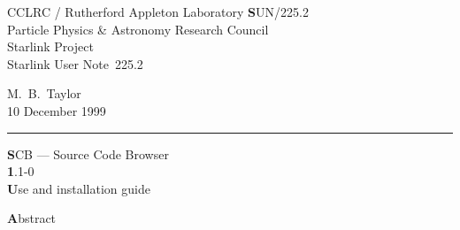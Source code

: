 \documentclass[twoside,11pt]{article}
\newcommand{\stardoccategory}  {Starlink User Note}
\newcommand{\stardocinitials}  {SUN}
\newcommand{\stardocnumber}    {225.2}
\newcommand{\stardocauthors}   {M.\ B.\ Taylor}
\newcommand{\stardocdate}      {10 December 1999}
\newcommand{\stardoctitle}     {SCB --- Source Code Browser}
\newcommand{\stardocversion}   {1.1-0}
\newcommand{\stardocmanual}    {Use and installation guide}
\newcommand{\stardocname}{\stardocinitials /\stardocnumber}
\newenvironment{latexonly}{}{}
\renewcommand{\_}{\texttt{\symbol{95}}}
\begin{document}
\thispagestyle{empty}

\begin{latexonly}
   CCLRC / {\textsc Rutherford Appleton Laboratory} \hfill {\textbf \stardocname}\\
   {\large Particle Physics \& Astronomy Research Council}\\
   {\large Starlink Project\\}
   {\large \stardoccategory\ \stardocnumber}
   \begin{flushright}
   \stardocauthors\\
   \stardocdate
   \end{flushright}
   \vspace{-4mm}
   \rule{\textwidth}{0.5mm}
   \vspace{5mm}
   \begin{center}
   {\Huge\textbf  \stardoctitle \\ [2.5ex]}
   {\LARGE\textbf \stardocversion \\ [4ex]}
   {\Huge\textbf  \stardocmanual}
   \end{center}
   \vspace{5mm}


   \vspace{10mm}
   \begin{center}
      {\Large\textbf Abstract}
   \end{center}
\end{latexonly}
\end{document}
